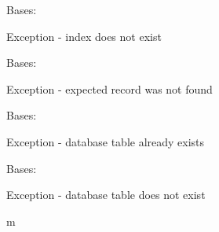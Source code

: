 \documentclass[letterpaper,10pt,english]{sphinxmanual}
\begin{document}

\begin{fulllineitems}
\label{\detokenize{index:mamba.lmdb_IndexMissing}}
Bases: 

Exception - index does not exist

\end{fulllineitems}


\begin{fulllineitems}
\label{\detokenize{index:mamba.lmdb_NotFound}}
Bases: 

Exception - expected record was not found

\end{fulllineitems}


\begin{fulllineitems}
\label{\detokenize{index:mamba.lmdb_TableExists}}
Bases: 

Exception - database table already exists

\end{fulllineitems}


\begin{fulllineitems}
\label{\detokenize{index:mamba.lmdb_TableMissing}}
Bases: 

Exception - database table does not exist

\end{fulllineitems}



\renewcommand{\indexname}{Python Module Index}
\begin{sphinxtheindex}
\def\bigletter#1{{\Large\sffamily#1}\nopagebreak\vspace{1mm}}
\bigletter{m}
\item {}
\end{sphinxtheindex}

\renewcommand{\indexname}{Index}
\printindex
\end{document}
